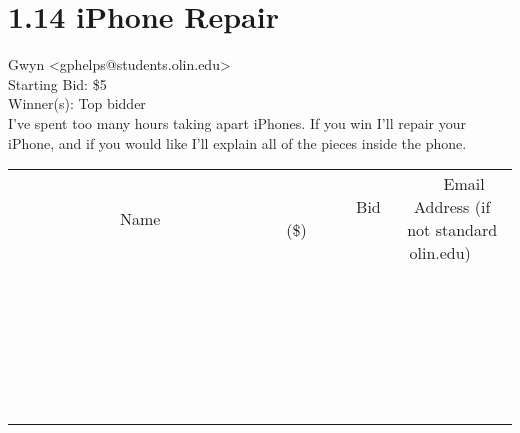 \documentclass[11pt]{article}
\begin{document}
					\section*{1.14 iPhone Repair}
					Gwyn <gphelps@students.olin.edu> \\
					Starting Bid: \$5 \\
					Winner(s): Top bidder \\
					I've spent too many hours taking apart iPhones. If you win I'll repair your iPhone, and if you would like I'll explain all of the pieces inside the phone. \\
					[6ex]
					\begin{tabular}{c c c}
						~~~~~~~~~~~~~Name~~~~~~~~~~~~~ & ~~~~~~~~~Bid (\$)~~~~~~~~~ & ~~~Email Address (if not standard olin.edu)~~~ \\
				
 & & \\
\hline
 & & \\
\hline
 & & \\
\hline
 & & \\
\hline
 & & \\
\hline
 & & \\
\hline
 & & \\
\hline
 & & \\
\hline
 & & \\
\hline
 & & \\
\hline
 & & \\
\hline
 & & \\
\hline
 & & \\
\hline
 & & \\
\hline
 & & \\
\hline
 & & \\
\hline
 & & \\
\hline
 & & \\
\hline
 & & \\
\hline
 & & \\
\hline
 & & \\
\hline
 & & \\
\hline
 & & \\
\hline
 & & \\
\hline
 & & \\
\hline
 & & \\
\hline
					\end{tabular}
					\clearpage
				
\end{document}
